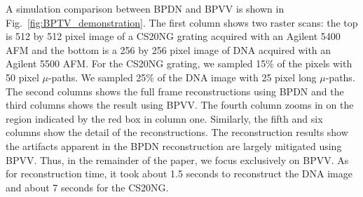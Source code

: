 \documentclass[twocolumn,oneside]{IEEEtran/IEEEtran}
\begin{document}



A simulation comparison between BPDN and BPVV is shown in
Fig.~\ref{fig:BPTV_demonstration}. The first column shows two raster scans: the top is 512 by 512 pixel image of a CS20NG grating acquired with an Agilent 5400 AFM and the bottom is a 256 by 256 pixel image of DNA acquired with an Agilent 5500 AFM.
For the CS20NG grating, we sampled 15\% of the pixels with 50 pixel $\mu$-paths. We sampled 25\% of the DNA image with 25 pixel long $\mu$-paths. The second columns shows the full frame reconstructions using BPDN and the third columns shows the result using BPVV. The fourth column zooms in on the region indicated by the red box in column one. Similarly, the fifth and six columns show the detail of the reconstructions. The reconstruction results show the artifacts apparent in the BPDN reconstruction are largely
mitigated using BPVV. Thus, in the remainder of the paper, we focus exclusively on BPVV. As for reconstruction time, it took about 1.5 seconds to reconstruct the DNA image and about 7 seconds for the CS20NG.
	

\end{document}
